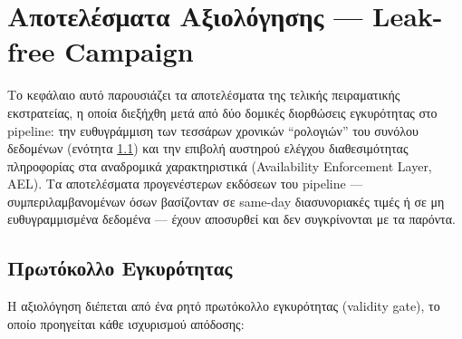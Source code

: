 \chapter{Αποτελέσματα Αξιολόγησης — Leak-free Campaign}
\label{ch:experiments_lf}

Το κεφάλαιο αυτό παρουσιάζει τα αποτελέσματα της τελικής πειραματικής εκστρατείας,
η οποία διεξήχθη μετά από δύο δομικές διορθώσεις εγκυρότητας στο pipeline: την
ευθυγράμμιση των τεσσάρων χρονικών ``ρολογιών'' του συνόλου δεδομένων (ενότητα
\ref{sec:lf_validity}) και την επιβολή αυστηρού ελέγχου διαθεσιμότητας πληροφορίας
στα αναδρομικά χαρακτηριστικά (Availability Enforcement Layer, AEL). Τα
αποτελέσματα προγενέστερων εκδόσεων του pipeline --- συμπεριλαμβανομένων όσων
βασίζονταν σε same-day διασυνοριακές τιμές ή σε μη ευθυγραμμισμένα δεδομένα ---
έχουν αποσυρθεί και δεν συγκρίνονται με τα παρόντα.

\section{Πρωτόκολλο Εγκυρότητας}
\label{sec:lf_validity}

Η αξιολόγηση διέπεται από ένα ρητό πρωτόκολλο εγκυρότητας (validity gate), το οποίο
προηγείται κάθε ισχυρισμού απόδοσης:

